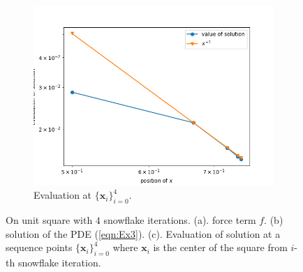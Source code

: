 \documentclass[12pt]{article}%
\theoremstyle{plain}
\numberwithin{equation}{section}
\begin{document}
\begin{figure}[H]
\begin{subfigure}[h]{0.45\linewidth}
\end{subfigure}
\\
\begin{subfigure}[h]{0.45\linewidth}
\caption{Evaluation at $\{\textbf{x}_i\}_{i=0}^4$.}
\includegraphics[width=\linewidth]{figures/Ex3/Ex3_evaluate.png}
\end{subfigure}
  \caption{On unit square with $4$ snowflake iterations.   (a). force term $f$. (b) solution of the PDE (\ref{eqn:Ex3}). (c). Evaluation of solution at a sequence points $\{\textbf{x}_i\}_{i=0}^4$ where $\textbf{x}_i$ is the center of the square from $i$-th snowflake iteration. }
  \label{Ex3_solution}
 \end{figure}
  
\end{document}
